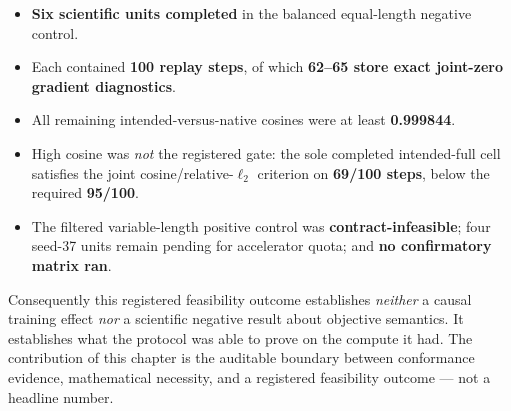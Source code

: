\begin{itemize}[leftmargin=1.4em,itemsep=2pt]
  \item \textbf{Six scientific units completed} in the balanced equal-length
  negative control.
  \item Each contained \textbf{100 replay steps}, of which \textbf{62--65 store
  exact joint-zero gradient diagnostics}.
  \item All remaining intended-versus-native cosines were at least
  \textbf{0.999844}.
  \item High cosine was \emph{not} the registered gate: the sole completed
  intended-full cell satisfies the joint cosine/relative-$\ell_2$ criterion on
  \textbf{69/100 steps}, below the required \textbf{95/100}.
  \item The filtered variable-length positive control was
  \textbf{contract-infeasible}; four seed-37 units remain pending for accelerator
  quota; and \textbf{no confirmatory matrix ran}.
\end{itemize}

Consequently this registered feasibility outcome establishes \emph{neither} a
causal training effect \emph{nor} a scientific negative result about objective
semantics. It establishes what the protocol was able to prove on the compute it
had. The contribution of this chapter is the auditable boundary between
conformance evidence, mathematical necessity, and a registered feasibility
outcome --- not a headline number.

